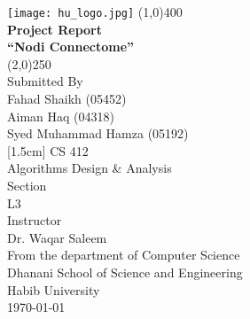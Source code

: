 
\begin{titlepage}
\thispagestyle{empty}
\doublespacing
\begin{center}
\texttt{[image: hu\_logo.jpg]}
\line(1,0){400}\\
[2mm]
\textbf{Project Report \\ ``Nodi Connectome''}\\
\line(2,0){250}\\
[0.5cm]
Submitted By\\
Fahad Shaikh (05452)\\
Aiman Haq (04318)\\
Syed Muhammad Hamza (05192)\\
[1.5cm]
CS 412\\
Algorithms Design \& Analysis\\ 
[1.0cm]
Section\\
L3\\
[1.0cm]
Instructor\\
Dr. Waqar Saleem\\
[1.5cm]
From the department of Computer Science\\
Dhanani School of Science and Engineering\\
Habib University\\
\today
\end{center} 
\end{titlepage}